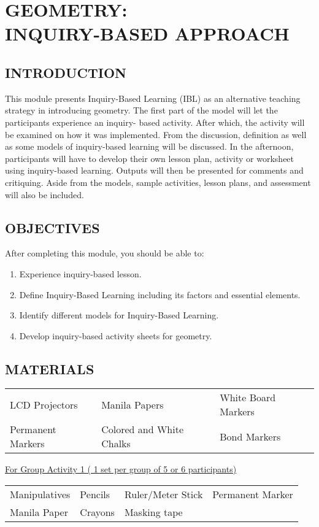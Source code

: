 \chapter{GEOMETRY:\\ INQUIRY-BASED APPROACH}
\section*{INTRODUCTION}
This module presents Inquiry-Based Learning (IBL) as an alternative teaching strategy in
introducing geometry. The first part of the model will let the participants experience an inquiry-
based activity. After which, the activity will be examined on how it was implemented. From the
discussion, definition as well as some models of inquiry-based learning will be discussed. In the
afternoon, participants will have to develop their own lesson plan, activity or worksheet using
inquiry-based learning. Outputs will then be presented for comments and critiquing. Aside from
the models, sample activities, lesson plans, and assessment will also be included.
\section*{OBJECTIVES}
After completing this module, you should be able to:
\begin{enumerate}
\item Experience inquiry-based lesson.
\item Define Inquiry-Based Learning including its factors and essential elements.
\item Identify different models for Inquiry-Based Learning.
\item Develop inquiry-based activity sheets for geometry.
\end{enumerate}
\section*{MATERIALS}
\begin{tabular}{lll}
LCD Projectors & Manila Papers & White Board Markers\\
Permanent Markers & Colored and White Chalks & Bond Markers\\
\end{tabular}

\underline{For Group Activity 1 ( 1 set per group of 5 or 6 participants)}

\begin{tabular}{llll}
Manipulatives & Pencils & Ruler/Meter Stick & Permanent Marker\\
Manila Paper & Crayons & Masking tape & \\
\end{tabular}

